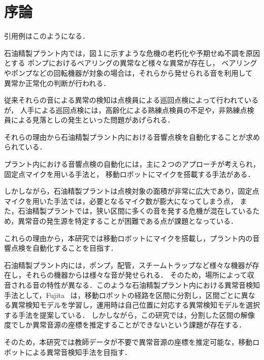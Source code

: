 \documentclass[../main]{subfiles}
\begin{document}
\graphicspath{{../figures/}}

\section{序論}
引用例は\cite{Schlick1994}\cite{Chikushi2020}このようになる．

石油精製プラント内では，図１に示すような危機の老朽化や予期せぬ不調を原因とする
ポンプにおけるベアリングの異常など様々な異常が存在し，
ベアリングやポンプなどの回転機器が対象の場合は，それらから発せられる音を利用して
異常か正常化の判断が行われる．

従来それらの音による異常の検知は点検員による巡回点検によって行われているが，
人手による巡回点検には，高齢化による熟練点検員の不足や，非熟練点検員による見落としの発生といった問題があげられる．

それらの理由から石油精製プラント内における音響点検を自動化することが求められている．


プラント内における音響点検の自動化には，主に２つのアプローチが考えられ，固定点マイクを用いる手法と，
移動ロボットにマイクを搭載する手法がある．

しかしながら，石油精製プラントは点検対象の面積が非常に広大であり，固定点マイクを用いた手法では，必要となるマイク数が膨大になってしまう点，
また，石油精製プラントでは，狭い区間に多くの音を発する危機が混在しているため，異常音の発生源を特定することが困難である点が課題となっている．

これらの理由から，本研究では移動ロボットにマイクを搭載し，プラント内の音響点検を自動化することを目指す．

石油精製プラント内には，ポンプ，配管，スチームトラップなど様々な機器が存在し，それらの機器からは様々な音が発せられる．
そのため，場所によって収音される音の特性が異なる．このような石油精製プラント内における異常音検知手法として，Fujita~\cite{fujita2022}
は，移動ロボットの経路を区間に分割し，区間ごとに異なる異常検知モデルを学習し，運用時は自己位置に対応する異常検知モデルを選択する手法を提案している．
しかしながら，この研究では，分割した区間の解像度でしか異常音源の座標を推定することができないという課題が存在する．


そのため，本研究では教師データが不要で異常音源の座標を推定可能な，移動ロボットによる異常音検知手法を目指す．
\end{document}
